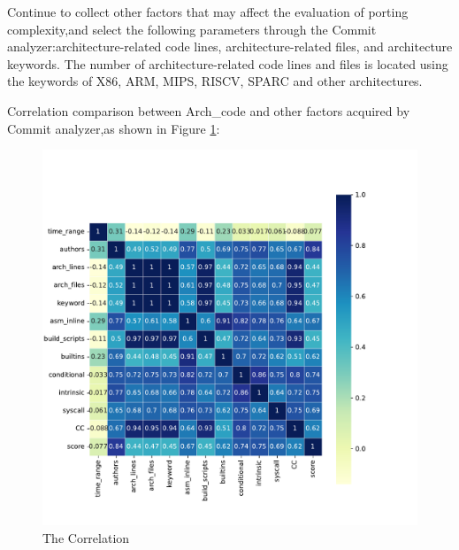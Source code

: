 \documentclass[sigconf,screen,review,anonymous]{acmart}
\begin{document}
Continue to collect other factors that may affect the evaluation of porting complexity,and select the following parameters through the Commit analyzer:architecture-related code lines, architecture-related files, and architecture keywords.
The number of architecture-related code lines and files is located using the keywords of X86, ARM, MIPS, RISCV, SPARC and other architectures.

Correlation comparison between Arch\_code and other factors acquired by Commit analyzer,as shown in Figure \ref{fig:correlation}:
\begin{figure}
  \centering
  \includegraphics[width=\linewidth]{figure3.pdf}
  \caption{The Correlation}
  \label{fig:correlation}
\end{figure}
\end{document}
